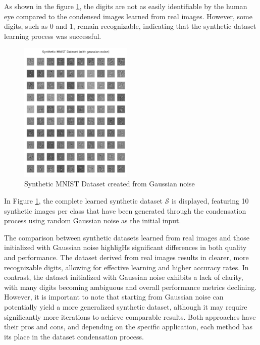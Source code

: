 \documentclass[conference, compsoc]{IEEEtran}
\begin{document}
	As shown in the figure \ref{fig:mnist_noise_syn_all}, the digits are not as easily identifiable by the human eye compared to the condensed images learned from real images. However, some digits, such as 0 and 1, remain recognizable, indicating that the synthetic dataset learning process was successful.
	
	\begin{figure}[H]
		\centering
		\includegraphics[width=0.48\textwidth]{mnist_noise_syn_all.png}
		\caption{Synthetic MNIST Dataset created from Gaussian noise}
		\label{fig:mnist_noise_syn_all}
	\end{figure}
	
	In Figure \ref{fig:mnist_noise_syn_all}, the complete learned synthetic dataset $\mathcal{S}$ is displayed, featuring 10 synthetic images per class that have been generated through the condensation process using random Gaussian noise as the initial input.
	
	The comparison between synthetic datasets learned from real images and those initialized with Gaussian noise highligHs significant differences in both quality and performance. The dataset derived from real images results in clearer, more recognizable digits, allowing for effective learning and higher accuracy rates. In contrast, the dataset initialized with Gaussian noise exhibits a lack of clarity, with many digits becoming ambiguous and overall performance metrics declining. However, it is important to note that starting from Gaussian noise can potentially yield a more generalized synthetic dataset, although it may require significantly more iterations to achieve comparable results. Both approaches have their pros and cons, and depending on the specific application, each method has its place in the dataset condensation process.
	
\end{document}
